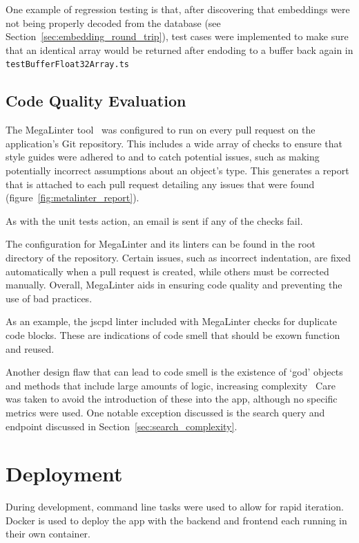 One example of regression testing is that, after discovering that embeddings were
not being properly decoded from the database (see Section~\ref{sec:embedding_round_trip}),
test cases were implemented to make sure that an identical array would be returned
after endoding to a buffer back again in \texttt{testBufferFloat32Array.ts}

\subsection{Code Quality Evaluation}
The MegaLinter tool~\cite{vuillamy_megalinter_nodate} was configured to run on every pull request on the application's Git repository. This includes a wide array
of checks to ensure that style guides were adhered to and to catch potential issues, such as making potentially incorrect
assumptions about an object's type. This generates a report that is attached to each pull request detailing
any issues that were found (figure~\ref{fig:metalinter_report}).

As with the unit tests action, an email is sent if any of the checks fail.

The configuration for MegaLinter and its linters can be found in the root directory of the repository.
Certain issues, such as incorrect indentation, are fixed automatically when a pull request is created, while others
must be corrected manually. Overall, MegaLinter aids in ensuring code quality and preventing the use of bad practices.

As an example, the jscpd linter included with MegaLinter checks for duplicate code blocks. These are indications of code
smell that should be exown function and reused.~\cite{fowler_refactoring_1997}

Another design flaw that can lead to code smell is the existence of \enquote*{god} objects
and methods that include large amounts of logic, increasing complexity~\cite{marinescu_measurement_2005,vaucher_tracking_2009}
Care was taken to avoid the introduction of these into the \chef{} app, although no specific
metrics were used. One notable exception discussed is the search query and endpoint discussed in
Section~\ref{sec:search_complexity}.


\section{Deployment}

During development, command line tasks were used to allow for rapid iteration. Docker is used to deploy
the app with the backend and frontend each running in their own container.


